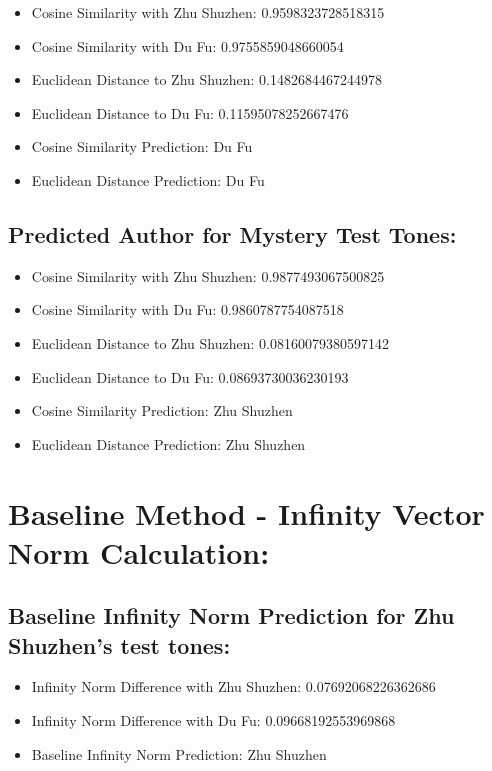 \documentclass[12pt]{article}
\begin{document}
\begin{itemize}
    \item Cosine Similarity with Zhu Shuzhen: 0.9598323728518315
    \item Cosine Similarity with Du Fu: 0.9755859048660054
    \item Euclidean Distance to Zhu Shuzhen: 0.1482684467244978
    \item Euclidean Distance to Du Fu: 0.11595078252667476
    \item Cosine Similarity Prediction: Du Fu
    \item Euclidean Distance Prediction: Du Fu
\end{itemize}

\subsection*{Predicted Author for Mystery Test Tones:}

\begin{itemize}
    \item Cosine Similarity with Zhu Shuzhen: 0.9877493067500825
    \item Cosine Similarity with Du Fu: 0.9860787754087518
    \item Euclidean Distance to Zhu Shuzhen: 0.08160079380597142
    \item Euclidean Distance to Du Fu: 0.08693730036230193
    \item Cosine Similarity Prediction: Zhu Shuzhen
    \item Euclidean Distance Prediction: Zhu Shuzhen
\end{itemize}

\section*{Baseline Method - Infinity Vector Norm Calculation: }

\subsection*{Baseline Infinity Norm Prediction for Zhu Shuzhen's test tones:}

\begin{itemize}
    \item Infinity Norm Difference with Zhu Shuzhen: 0.07692068226362686
    \item Infinity Norm Difference with Du Fu: 0.09668192553969868
    \item Baseline Infinity Norm Prediction: Zhu Shuzhen
\end{itemize}
\end{document}
